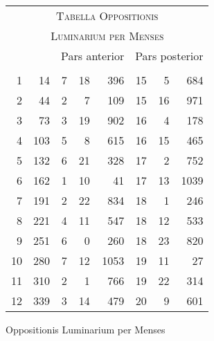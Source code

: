 %
\begin{tabnums} %
\footnotesize
\centering
\setlength{\tabcolsep}{1.0ex}
\renewcommand{\arraystretch}{1.072} %
%
\newcommand{\cwd}{3.2em}
\newcommand{\da}{{\tiny †}}
\newcommand{\db}{{\scriptsize o}}
\newcommand{\ang}{90}
\newcommand{\hsb}[1]{\footnotesize{#1}}
\newcommand{\hsa}[1]{\tiny{#1}}
%
\newcommand{\hdrB}{%
  ~ & ~ &
  \multicolumn{3}{c}{\hsb{Pars anterior}} &
  \multicolumn{3}{c}{\hsb{Pars posterior}}  
}
%
\newcommand{\hdrA}{%
  \ch{\hsa{Men-}}{\hsa{Men\-ses}} &
  \ch{\hsa{men-}}{\hsa{Dies mensium}} &
  \ch{\hsa{Feria}}{\hsa{Feria}}&
  \ch{\hsa{Hor.}}{\hsa{Hor.}} &
  \ch{\hsa{Scrup.}}{\hsa{Scrup.}} &
  \ch{\hsa{Dies}}{\hsa{Dies}} &
  \ch{\hsa{Hor.}}{\hsa{Hor.}} &
  \ch{\hsa{Scrup.}}{\hsa{Scrup.}}
}
%
\newcommand{\hdrs}{%
\hdrB \\
\cmidrule(lr){3-5} \cmidrule(lr){6-8}
\hdrA \\
}
%
\begin{tabular}[c]{@{} r r rrr rrr @{}}
\toprule
\multicolumn{8}{c}{\large\textsc{Tabella Oppositionis}} \\
\multicolumn{8}{c}{\normalsize\textsc{Luminarium per Menses}} \\
\toprule
\hdrs %
\midrule
  1 &  14 &  7 & 18 &  396 & 15 &  5 &  684 \\
  2 &  44 &  2 &  7 &  109 & 15 & 16 &  971 \\
  3 &  73 &  3 & 19 &  902 & 16 &  4 &  178 \\
  4 & 103 &  5 &  8 &  615 & 16 & 15 &  465 \\
  5 & 132 &  6 & 21 &  328 & 17 &  2 &  752 \\
  6 & 162 &  1 & 10 &   41 & 17 & 13 & 1039 \\
  7 & 191 &  2 & 22 &  834 & 18 &  1 &  246 \\
  8 & 221 &  4 & 11 &  547 & 18 & 12 &  533 \\
  9 & 251 &  6 &  0 &  260 & 18 & 23 &  820 \\
 10 & 280 &  7 & 12 & 1053 & 19 & 11 &   27 \\
 11 & 310 &  2 &  1 &  766 & 19 & 22 &  314 \\
 12 & 339 &  3 & 14 &  479 & 20 &  9 &  601 \\
\bottomrule
\end{tabular}
\caption{Oppositionis Luminarium per Menses}
\label{tab:p203b}
\end{tabnums}
